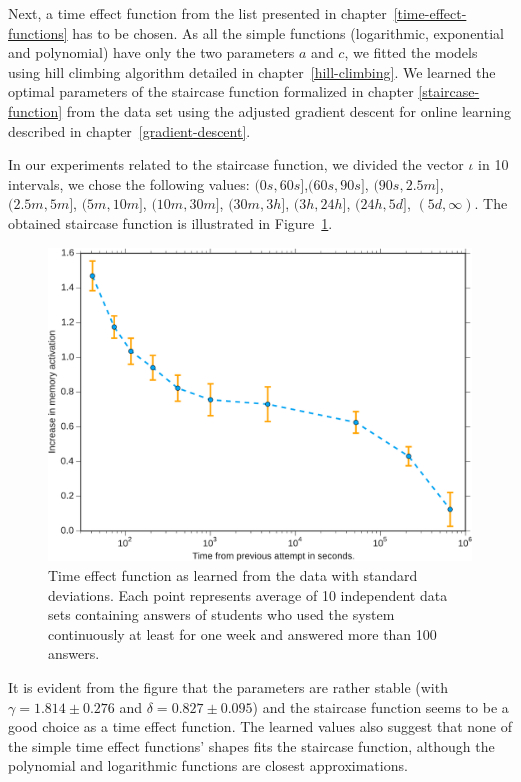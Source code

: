 Next, a time effect function from the list presented in chapter~\ref{time-effect-functions} has to be chosen. As all the simple functions (logarithmic, exponential and polynomial) have only the two parameters $a$ and $c$, we fitted the models using hill climbing algorithm detailed in chapter~\ref{hill-climbing}. We learned the optimal parameters of the staircase function formalized in chapter \ref{staircase-function} from the data set using the adjusted gradient descent for online learning described in chapter~\ref{gradient-descent}.

In our experiments related to the staircase function, we divided the vector $\iota$ in 10 intervals, we chose the following values: $(0s, 60s]$,$(60s, 90s]$, $(90s, 2.5m]$, $(2.5m, 5m]$, $(5m, 10m]$, $(10m, 30m]$, $(30m, 3h]$, $(3h, 24h]$, $(24h, 5d]$, $(5d, \infty)$. The obtained staircase function is illustrated in Figure~\ref{fig:learned-time-effect-function}.

\begin{figure}[htbp]
  \centering
  \includegraphics[width=\textwidth]{img/learned-time-effect-function}
  \caption{Time effect function as learned from the data with standard deviations. Each point represents average of 10 independent data sets containing answers of students who used the system continuously at least for one week and answered more than 100 answers.}
  \label{fig:learned-time-effect-function}
\end{figure}

It is evident from the figure that the parameters are rather stable (with $\gamma = 1.814 \pm 0.276$ and $\delta = 0.827 \pm 0.095$) and the staircase function seems to be a good choice as a time effect function. The learned values also suggest that none of the simple time effect functions' shapes fits the staircase function, although the polynomial and logarithmic functions are closest approximations.

